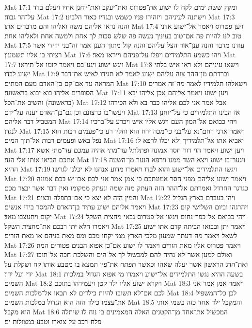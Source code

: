 Mat 17:1  ומקץ ששת ימים לקח לו ישוע את־פטרוס ואת־יעקב ואת־יוחנן אחיו ויעלם בדד על־הר גבוה׃
Mat 17:2  וישתנה לעיניהם ויזהירו פניו כשמש ובגדיו כאור הלבינו׃
Mat 17:3  והנה נראו אליהם משה ואליהו והם מדברים אתו׃
Mat 17:4  ויען פטרוס ויאמר אל־ישוע אדני טוב לנו להיות פה אם־טוב בעיניך נעשה פה שלש סכות לך אחת ולמשה אחת ולאליהו אחת׃
Mat 17:5  עודנו מדבר והנה ענן־אור הצל עליהם והנה קול מתוך הענן אמר זה־בני ידידי אשר רציתי בו אליו תשמעון׃
Mat 17:6  ויהי כשמע התלמידים ויפלו על־פניהם וייראו מאד׃
Mat 17:7  ויגש ישוע ויגע־בם ויאמר קומו אל־תיראו׃
Mat 17:8  וישאו עיניהם ולא ראו איש בלתי ישוע לבדו׃
Mat 17:9  וברדתם מן־ההר צוה עליהם ישוע לאמר לא תגידו לאיש את־דבר המראה עד אם־קם בן־האדם מעם המתים׃
Mat 17:10  וישאלהו תלמידיו לאמר מה־זה אמרים הסופרים אליהו בוא יבוא בראשונה׃
Mat 17:11  ויען ישוע ויאמר אליהם אכן אליהו יבא (בראשונה) והשיב את־הכל׃
Mat 17:12  אבל אמר אני לכם אליהו כבר בא ולא הכירהו ויעשו־בו כרצונם וכן גם־בן־האדם יענה על־ידם׃
Mat 17:13  אז הבינו התלמידים כי על־יוחנן המטביל דבר אליהם׃
Mat 17:14  ויהי כבואם אל־המון העם ויגש אליו איש ויכרע על־ברכיו לנגדו׃
Mat 17:15  ויאמר אדני רחם־נא על־בני כי־מכה ירח הוא וחליו רע כי־פעמים רבות הוא נפל באש ופעמים רבות אל־תוך המים׃
Mat 17:16  ואביא אתו אל־תלמידיך ולא יכלו לרפא לו׃
Mat 17:17  ויען ישוע ויאמר הוי דור חסר אמונה ופתלתל עד־מתי אהיה עמכם עד־מתי אשא אתכם הביאו אותו אלי הנה׃
Mat 17:18  ויגער־בו ישוע ויצא השד ממנו וירפא הנער מן־השעה ההיא׃
Mat 17:19  ויגשו התלמידים אל־ישוע והוא לבדו ויאמרו מדוע אנחנו לא יכלנו לגרשו׃
Mat 17:20  ויאמר ישוע אליהם מפני חסר אמונתכם כי אמן אמר אני לכם אם־יש בכם אמונה כגרגר החרדל ואמרתם אל־ההר הזה העתק מזה שמה ונעתק ממקומו ואין דבר אשר יבצר מכם׃
Mat 17:21  והמין הזה לא יצא כי אם־בתפלה ובצום׃
Mat 17:22  ויהי בעברם בארץ הגליל ויאמר אליהם ישוע עתיד בן־האדם להמסר בידי אנשים׃
Mat 17:23  ויהרגהו וביום השלישי קום יקום ויתעצבו מאד׃
Mat 17:24  ויהי כבואם אל־כפר־נחום ויגשו אל־פטרוס גבאי מחצית השקל ויאמרו הלא יתן רבכם את־מחצית השקל׃
Mat 17:25  ויאמר יתן ובבואו הביתה קדם אתו ישוע לשאל ויאמר מה־דעתך שמעון מלכי הארץ ממי יקחו מכס ומס מאת בניהם או מאת הזרים׃
Mat 17:26  ויאמר פטרוס אליו מאת הזרים ויאמר לו ישוע אם־כן אפוא הבנים פטורים המה׃
Mat 17:27  ואולם למען אשר־לא־נהיה להם למכשול לך אל־הים והשלכת חכה אל־תוכו ואת־הדג הראשון אשר יעלה שאהו וכאשר תפתח את־פיו תמצא בו מטבע אותו קח ושקלת על ידי ועל ידך׃
Mat 18:1  בשעה ההיא נגשו התלמידים אל־ישוע ויאמרו מי אפוא הגדול במלכות השמים׃
Mat 18:2  ויקרא ישוע אליו ילד קטן ויעמידהו בתוכם׃
Mat 18:3  ויאמר אמן אמר אני לכם אם־לא תשובו להיות כילדים לא תבאו אל־מלכות השמים׃
Mat 18:4  לכן כל־המשפיל את־עצמו כילד הזה הוא הגדול במלכות השמים׃
Mat 18:5  והמקבל ילד אחד כזה בשמי אותי הוא מקבל׃
Mat 18:6  המכשיל את־אחד מן־הקטנים האלה המאמינים בי נוח לו שיתלה פלח־רכב על־צוארו וטבע במצולות ים׃
